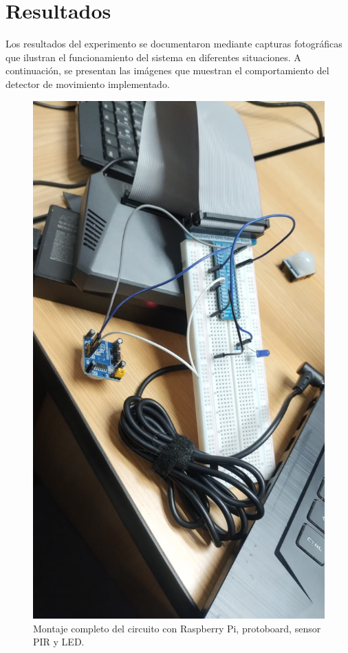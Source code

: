 \section{Resultados}
Los resultados del experimento se documentaron mediante capturas fotográficas que ilustran el funcionamiento del sistema en diferentes situaciones. A continuación, se presentan las imágenes que muestran el comportamiento del detector de movimiento implementado.

\begin{figure}[h]
	\centering
	\includegraphics[width=0.5\textheight]{imagenes/1.jpg}
	\caption{Montaje completo del circuito con Raspberry Pi, protoboard, sensor PIR y LED.}
	\label{fig:circuito}
\end{figure}

